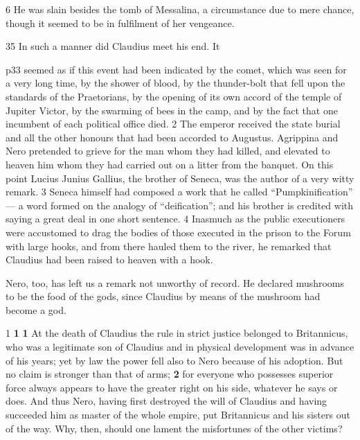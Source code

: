 6
He was slain besides the tomb of Messalina, a circumstance due to mere chance, though it seemed to be in fulfilment of her vengeance.

35
In such a manner did Claudius meet his end. It

p33 seemed as if this event had been indicated by the comet, which was seen for a very long time, by the shower of blood, by the thunder-bolt that fell upon the standards of the Praetorians, by the opening of its own accord of the temple of Jupiter Victor, by the swarming of bees in the camp, and by the fact that one incumbent of each political office died. 2 The emperor received the state burial and all the other honours that had been accorded to Augustus. Agrippina and Nero pretended to grieve for the man whom they had killed, and elevated to heaven him whom they had carried out on a litter from the banquet. On this point Lucius Junius Gallius, the brother of Seneca, was the author of a very witty remark. 3 Seneca himself had composed a work that he called ``Pumpkinification'' \texthebrew{—} a word formed on the analogy of ``deification''; and his brother is credited with saying a great deal in one short sentence. 4 Inasmuch as the public executioners were accustomed to drag the bodies of those executed in the prison to the Forum with large hooks, and from there hauled them to the river, he remarked that Claudius had been raised to heaven with a hook.

Nero, too, has left us a remark not unworthy of record. He declared mushrooms to be the food of the gods, since Claudius by means of the mushroom had become a god.


1 \textbf{1} \textbf{1} At the death of Claudius the rule in strict justice belonged to Britannicus, who was a legitimate son of Claudius and in physical development was in advance of his years; yet by law the power fell also to Nero because of his adoption. But no claim is stronger than that of arms; \textbf{2} for everyone who possesses superior force always appears to have the greater right on his side, whatever he says or does. And thus Nero, having first destroyed the will of Claudius and having succeeded him as master of the whole empire, put Britannicus and his sisters out of the way. Why, then, should one lament the misfortunes of the other victims?


